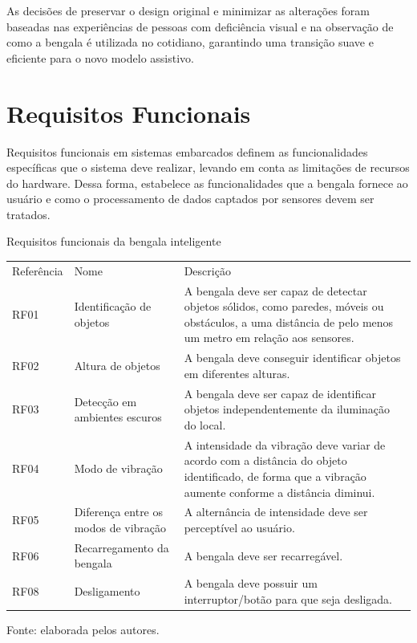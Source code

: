 As decisões de preservar o design original e minimizar as alterações foram baseadas nas experiências de pessoas com deficiência visual e na observação de como a bengala é utilizada no cotidiano, garantindo uma transição suave e eficiente para o novo modelo assistivo.

\section{Requisitos Funcionais}
    Requisitos funcionais em sistemas embarcados definem as funcionalidades específicas que o sistema deve realizar, levando em conta as limitações de recursos do hardware. Dessa forma, estabelece as funcionalidades que a bengala fornece ao usuário e como o processamento de dados captados por sensores devem ser tratados.


\begin{quadro}[!ht]    
    \captionsetup{width=1.0\textwidth} %
    \caption{Requisitos funcionais da bengala inteligente}  
    \renewcommand{\arraystretch}{1.5} %
    \begin{tabular}{p{}p{}p{}} %
        \toprule
        Referência & Nome & Descrição \\
        RF01 & Identificação de objetos & A bengala deve ser capaz de detectar objetos sólidos, como paredes, móveis ou obstáculos, a uma distância de pelo menos um metro em relação aos sensores.   \\
        RF02 & Altura de objetos  & A bengala deve conseguir identificar objetos em diferentes alturas. \\
        RF03 & Detecção em ambientes escuros  &  A bengala deve ser capaz de identificar objetos independentemente da iluminação do local.  \\
        RF04 & Modo de vibração  &  A intensidade da vibração deve variar de acordo com a distância do objeto identificado, de forma que a vibração aumente conforme a distância diminui.  \\
        RF05 & Diferença entre os modos de vibração  & A alternância de intensidade deve ser perceptível ao usuário. \\
        RF06 & Recarregamento da bengala  & A bengala deve ser recarregável.  \\
        RF08 & Desligamento  & A bengala deve possuir um interruptor/botão para que seja desligada. \\
        \bottomrule
    \end{tabular}
    \caption*{Fonte: elaborada pelos autores.} %
\end{quadro}

